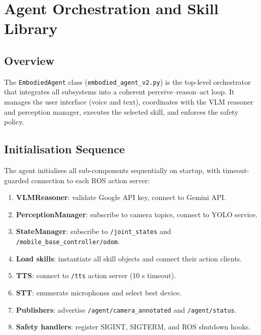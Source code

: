 \chapter{Agent Orchestration and Skill Library}
\label{ch:agent}

\section{Overview}

The \texttt{EmbodiedAgent} class (\texttt{embodied\_agent\_v2.py}) is the top-level
orchestrator that integrates all subsystems into a coherent perceive--reason--act
loop.
It manages the user interface (voice and text), coordinates with the VLM reasoner and
perception manager, executes the selected skill, and enforces the safety policy.

\section{Initialisation Sequence}

The agent initialises all sub-components sequentially on startup, with timeout-guarded
connection to each ROS action server:

\begin{enumerate}
  \item \textbf{VLMReasoner}: validate Google API key, connect to Gemini API.
  \item \textbf{PerceptionManager}: subscribe to camera topics, connect to YOLO service.
  \item \textbf{StateManager}: subscribe to \texttt{/joint\_states} and
        \texttt{/mobile\_base\_controller/odom}.
  \item \textbf{Load skills}: instantiate all skill objects and connect their
        action clients.
  \item \textbf{TTS}: connect to \texttt{/tts} action server (10 s timeout).
  \item \textbf{STT}: enumerate microphones and select best device.
  \item \textbf{Publishers}: advertise \texttt{/agent/camera\_annotated} and
        \texttt{/agent/status}.
  \item \textbf{Safety handlers}: register SIGINT, SIGTERM, and ROS shutdown hooks.
\end{enumerate}


